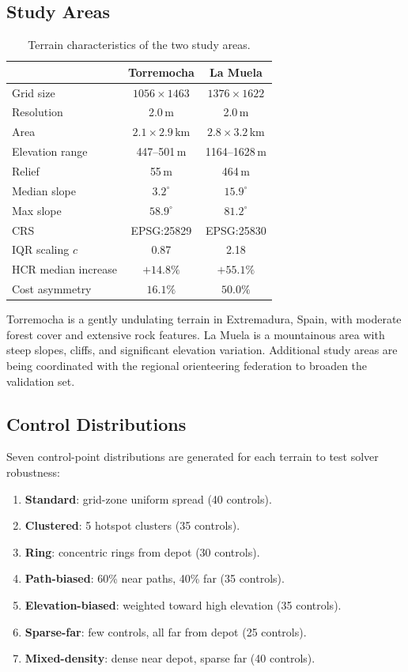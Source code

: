 \documentclass[preprint,11pt]{elsarticle}
\begin{document}
\subsection{Study Areas}

\begin{table}[H]
\centering
\caption{Terrain characteristics of the two study areas.}
\label{tab:terrain}
\begin{tabular}{lcc}
\toprule
& \textbf{Torremocha} & \textbf{La Muela} \\
\midrule
Grid size & $1056 \times 1463$ & $1376 \times 1622$ \\
Resolution & 2.0\,m & 2.0\,m \\
Area & $2.1 \times 2.9$\,km & $2.8 \times 3.2$\,km \\
Elevation range & 447--501\,m & 1164--1628\,m \\
Relief & 55\,m & 464\,m \\
Median slope & $3.2^\circ$ & $15.9^\circ$ \\
Max slope & $58.9^\circ$ & $81.2^\circ$ \\
CRS & EPSG:25829 & EPSG:25830 \\
IQR scaling $c$ & 0.87 & 2.18 \\
HCR median increase & $+14.8\%$ & $+55.1\%$ \\
Cost asymmetry & $16.1\%$ & $50.0\%$ \\
\bottomrule
\end{tabular}
\end{table}

Torremocha is a gently undulating terrain in Extremadura, Spain, with moderate forest cover and extensive rock features.
La Muela is a mountainous area with steep slopes, cliffs, and significant elevation variation.
Additional study areas are being coordinated with the regional orienteering federation to broaden the validation set.

\subsection{Control Distributions}

Seven control-point distributions are generated for each terrain to test solver robustness:
\begin{enumerate}[nosep]
  \item \textbf{Standard}: grid-zone uniform spread (40 controls).
  \item \textbf{Clustered}: 5 hotspot clusters (35 controls).
  \item \textbf{Ring}: concentric rings from depot (30 controls).
  \item \textbf{Path-biased}: 60\% near paths, 40\% far (35 controls).
  \item \textbf{Elevation-biased}: weighted toward high elevation (35 controls).
  \item \textbf{Sparse-far}: few controls, all far from depot (25 controls).
  \item \textbf{Mixed-density}: dense near depot, sparse far (40 controls).
\end{enumerate}
\end{document}
